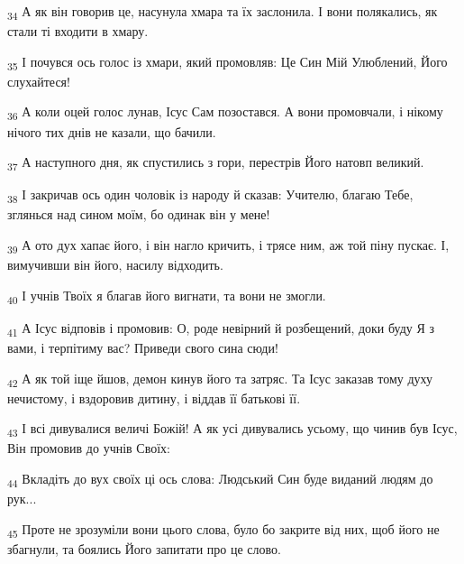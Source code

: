 \begin{tcolorbox}
\textsubscript{34} А як він говорив це, насунула хмара та їх заслонила. І вони полякались, як стали ті входити в хмару.
\end{tcolorbox}
\begin{tcolorbox}
\textsubscript{35} І почувся ось голос із хмари, який промовляв: Це Син Мій Улюблений, Його слухайтеся!
\end{tcolorbox}
\begin{tcolorbox}
\textsubscript{36} А коли оцей голос лунав, Ісус Сам позостався. А вони промовчали, і нікому нічого тих днів не казали, що бачили.
\end{tcolorbox}
\begin{tcolorbox}
\textsubscript{37} А наступного дня, як спустились з гори, перестрів Його натовп великий.
\end{tcolorbox}
\begin{tcolorbox}
\textsubscript{38} І закричав ось один чоловік із народу й сказав: Учителю, благаю Тебе, зглянься над сином моїм, бо одинак він у мене!
\end{tcolorbox}
\begin{tcolorbox}
\textsubscript{39} А ото дух хапає його, і він нагло кричить, і трясе ним, аж той піну пускає. І, вимучивши він його, насилу відходить.
\end{tcolorbox}
\begin{tcolorbox}
\textsubscript{40} І учнів Твоїх я благав його вигнати, та вони не змогли.
\end{tcolorbox}
\begin{tcolorbox}
\textsubscript{41} А Ісус відповів і промовив: О, роде невірний й розбещений, доки буду Я з вами, і терпітиму вас? Приведи свого сина сюди!
\end{tcolorbox}
\begin{tcolorbox}
\textsubscript{42} А як той іще йшов, демон кинув його та затряс. Та Ісус заказав тому духу нечистому, і вздоровив дитину, і віддав її батькові її.
\end{tcolorbox}
\begin{tcolorbox}
\textsubscript{43} І всі дивувалися величі Божій! А як усі дивувались усьому, що чинив був Ісус, Він промовив до учнів Своїх:
\end{tcolorbox}
\begin{tcolorbox}
\textsubscript{44} Вкладіть до вух своїх ці ось слова: Людський Син буде виданий людям до рук...
\end{tcolorbox}
\begin{tcolorbox}
\textsubscript{45} Проте не зрозуміли вони цього слова, було бо закрите від них, щоб його не збагнули, та боялись Його запитати про це слово.
\end{tcolorbox}
